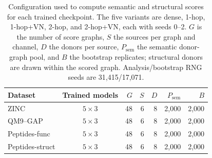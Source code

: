 \begin{table}[t]
  \centering
  \footnotesize
  \setlength{\tabcolsep}{3.5pt}
  \begin{tabular}{@{}lcrrrrr@{}}
    \toprule
    Dataset & Trained models & $G$ & $S$ & $D$ & $P_{\mathrm{sem}}$ & $B$ \\
    \midrule
    ZINC             & $5\!\times\!3$ & 48 & 6 & 8 & 2,000 & 2,000 \\
    QM9--GAP         & $5\!\times\!3$ & 48 & 6 & 8 & 2,000 & 2,000 \\
    Peptides-func    & $5\!\times\!3$ & 48 & 6 & 8 & 2,000 & 2,000 \\
    Peptides-struct  & $5\!\times\!3$ & 48 & 6 & 8 & 2,000 & 2,000 \\
    \bottomrule
  \end{tabular}
  \caption{Configuration used to compute semantic and structural scores for each trained
  checkpoint. The five variants are dense, 1-hop, 1-hop+VN, 2-hop, and 2-hop+VN, each with seeds
  0--2. $G$ is the number of score graphs, $S$ the sources per graph and channel, $D$ the donors
  per source, $P_{\mathrm{sem}}$ the semantic donor-graph pool, and $B$ the bootstrap replicates;
  structural donors are drawn within the scored graph. Analysis/bootstrap RNG seeds are
  31,415/17,071.}
  \label{tab:score-computation-config}
\end{table}
